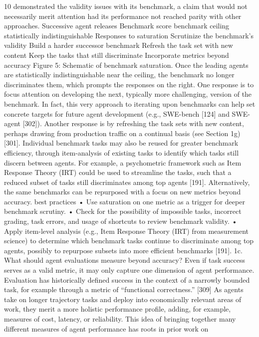 10
demonstrated the validity issues with its benchmark, a claim that would not necessarily merit attention
had its performance not reached parity with other approaches.
Successive agent releases
Benchmark score
benchmark ceiling
statistically
indistinguishable
Responses to saturation
Scrutinize the benchmark’s validity
Build a harder successor benchmark
Refresh the task set with new content
Keep the tasks that still discriminate
Incorporate metrics beyond accuracy
Figure 5: Schematic of benchmark saturation. Once the leading agents are statistically indistinguishable near the
ceiling, the benchmark no longer discriminates them, which prompts the responses on the right.
One response is to focus attention on developing the next, typically more challenging, version of the
benchmark. In fact, this very approach to iterating upon benchmarks can help set concrete targets
for future agent development (e.g., SWE-bench [124] and SWE-agent [302]). Another response is by
refreshing the task sets with new content, perhaps drawing from production traffic on a continual basis
(see Section 1g) [301]. Individual benchmark tasks may also be reused for greater benchmark efficiency,
through item-analysis of existing tasks to identify which tasks still discern between agents. For example,
a psychometric framework such as Item Response Theory (IRT) could be used to streamline the tasks,
such that a reduced subset of tasks still discriminates among top agents [191]. Alternatively, the same
benchmarks can be repurposed with a focus on new metrics beyond accuracy.
best practices
• Use saturation on one metric as a trigger for deeper benchmark scrutiny.
• Check for the possibility of impossible tasks, incorrect grading, task errors, and usage of shortcuts to review
benchmark validity.
• Apply item-level analysis (e.g., Item Response Theory (IRT) from measurement science) to determine which
benchmark tasks continue to discriminate among top agents, possibly to repurpose subsets into more efficient
benchmarks [191].
1c. What should agent evaluations measure beyond accuracy?
Even if task success serves as a valid metric, it may only capture one dimension of agent performance.
Evaluation has historically defined success in the context of a narrowly bounded task, for example through
a metric of “functional correctness.” [309] As agents take on longer trajectory tasks and deploy into
economically relevant areas of work, they merit a more holistic performance profile, adding, for example,
measures of cost, latency, or reliability.
This idea of bringing together many different measures of agent performance has roots in prior work on
